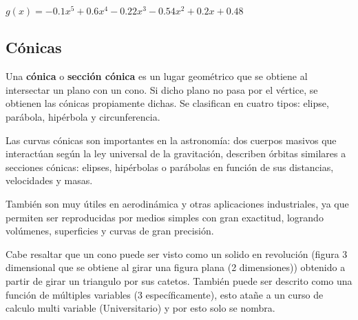 $g(x)=-0.1x^5+0.6x^4-0.22x^3-0.54x^2+0.2x+0.48$




\subsection{Cónicas}


    Una \textbf{cónica} o \textbf{sección cónica} es un lugar geométrico que se
    obtiene al intersectar un plano con un cono. Si dicho plano no pasa por el
    vértice, se obtienen las cónicas propiamente dichas. Se clasifican en
    cuatro tipos: elipse, parábola, hipérbola y circunferencia.

    Las curvas cónicas son importantes en la astronomía: dos cuerpos masivos
    que interactúan según la ley universal de la gravitación, describen órbitas
    similares a secciones cónicas: elipses, hipérbolas o parábolas en función
    de sus distancias, velocidades y masas.

    También son muy útiles en aerodinámica y otras aplicaciones industriales,
    ya que permiten ser reproducidas por medios simples con gran exactitud,
    logrando volúmenes, superficies y curvas de gran precisión.

    Cabe resaltar que un cono puede ser visto como un solido en revolución (figura
    3 dimensional que se obtiene al girar una figura plana (2 dimensiones)) obtenido
    a partir de girar un triangulo por sus catetos. También puede ser descrito
    como una función de múltiples variables (3 específicamente), esto atañe a un
    curso de calculo multi variable (Universitario) y por esto solo se nombra.

